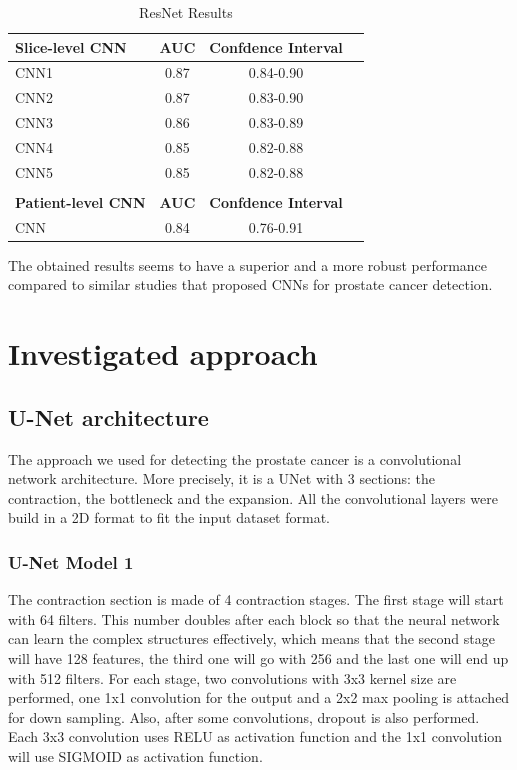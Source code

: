 \documentclass[runningheads,a4paper,11pt]{report}
\begin{document}
\begin{table}[htbp]
		\begin{center}
			\begin{tabular}{p{180pt}c c c}
				\textbf{Slice-level CNN}&\textbf{AUC}&\textbf{Confdence Interval}\\
				\hline\hline
 			CNN1& 0.87& 0.84-0.90\\
 			CNN2& 0.87& 0.83-0.90\\
 			CNN3& 0.86& 0.83-0.89\\
 			CNN4& 0.85& 0.82-0.88\\
 			CNN5& 0.85& 0.82-0.88\\
 			\\
 			\textbf{Patient-level CNN}&\textbf{AUC}&\textbf{Confdence Interval}\\
			\hline\hline
 			CNN& 0.84& 0.76-0.91\\
			\end{tabular}
		\end{center}
		\caption{ResNet Results \cite{deepCNN}}
		\label{tableParameters}
\end{table}
The obtained results seems to have a superior and a more robust performance compared to similar studies that proposed CNNs for prostate cancer detection.
\chapter{Investigated approach}
\label{chapter:proposedApproach}

\section{U-Net architecture }
\label{section:network}

The approach we used for detecting the prostate cancer is a convolutional network architecture. More precisely, it is a UNet with 3 sections: the contraction, the bottleneck and the expansion. All the convolutional layers were build in a 2D format to fit the input dataset format.

\subsection{U-Net Model 1}
\label{section:model1}
The contraction section is made of 4 contraction stages. The first stage will start with 64 filters. This number doubles after each block so that the neural network can learn the complex structures effectively, which means that the second stage will have 128 features, the third one will go with 256 and the last one will end up with 512 filters. For each stage, two convolutions with 3x3 kernel size are performed, one 1x1 convolution for the output and a 2x2 max pooling is attached for down sampling. Also, after some convolutions, dropout is also performed. Each 3x3 convolution uses RELU as activation function and the 1x1 convolution will use SIGMOID as activation function.
\end{document}
